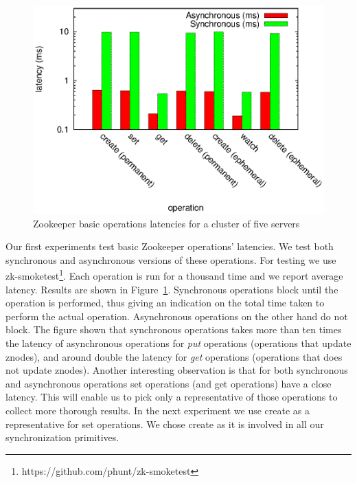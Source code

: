 \begin{figure}[h]
\centering
\includegraphics[scale=0.75]{img/ops_latencies_logscale.eps}
\caption{Zookeeper basic operations latencies for a cluster of five servers}
\label{fig:ops_latencies}
\end{figure}

Our first experiments test basic Zookeeper operations' latencies. We test both synchronous and asynchronous versions of these operations. For testing we use zk-smoketest\footnote{https://github.com/phunt/zk-smoketest}. Each operation is run for a thousand time and we report average latency. Results are shown in Figure~\ref{fig:ops_latencies}. Synchronous operations block until the operation is performed, thus giving an indication on the total time taken to perform the actual operation. Asynchronous operations on the other hand do not block. The figure shown that synchronous operations takes more than ten times the latency of asynchronous operations for \emph{put} operations (operations that update znodes), and around double the latency for \emph{get} operations (operations that does not update znodes). Another interesting observation is that for both synchronous and asynchronous operations set operations (and get operations) have a close latency. This will enable us to pick only a representative of those operations to collect more thorough results. In the next experiment we use create as a representative for set operations. We chose create as it is involved in all our synchronization primitives.

